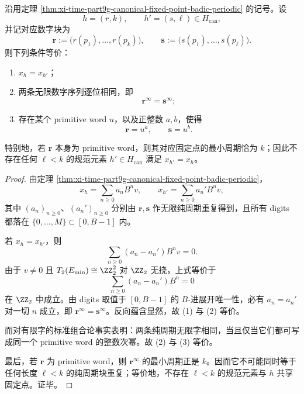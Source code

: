 \begin{corollary}\label{cor:xi-time-part9g-fixed-point-primitive-word-classification}
沿用定理 \ref{thm:xi-time-part9g-canonical-fixed-point-badic-periodic} 的记号。设
\[
h=(r,k),\qquad h'=(s,\ell)\in H_{\mathrm{can}},
\]
并记对应数字块为
\[
\mathbf r:=\bigl(r(p_1),\dots,r(p_k)\bigr),
\qquad
\mathbf s:=\bigl(s(p_1),\dots,s(p_\ell)\bigr).
\]
则下列条件等价：
\begin{enumerate}
  \item \(x_h=x_{h'}\)；
  \item 两条无限数字序列逐位相同，即
  \[
  \mathbf r^\infty=\mathbf s^\infty;
  \]
  \item 存在某个 primitive word \(u\)，以及正整数 \(a,b\)，使得
  \[
  \mathbf r=u^a,\qquad \mathbf s=u^b.
  \]
\end{enumerate}
特别地，若 \(\mathbf r\) 本身为 primitive word，则其对应固定点的最小周期恰为 \(k\)；因此不存在任何 \(\ell<k\) 的规范元素 \(h'\in H_{\mathrm{can}}\) 满足 \(x_{h'}=x_h\)。
\end{corollary}
\begin{proof}
由定理 \ref{thm:xi-time-part9g-canonical-fixed-point-badic-periodic}，
\[
x_h=\sum_{n\ge 0}a_n B^n v,
\qquad
x_{h'}=\sum_{n\ge 0}a_n' B^n v,
\]
其中 \((a_n)_{n\ge 0}\)、\((a_n')_{n\ge 0}\) 分别由 \(\mathbf r,\mathbf s\) 作无限纯周期重复得到，且所有 digits 都落在 \(\{0,\dots,M\}\subset[0,B-1]\) 内。

若 \(x_h=x_{h'}\)，则
\[
\sum_{n\ge 0}(a_n-a_n')B^n v=0.
\]
由于 \(v\neq 0\) 且 \(T_2(E_{\min})\cong \ZZ_2^2\) 对 \(\ZZ_2\) 无挠，上式等价于
\[
\sum_{n\ge 0}(a_n-a_n')B^n=0
\]
在 \(\ZZ_2\) 中成立。由 digits 取值于 \([0,B-1]\) 的 \(B\)-进展开唯一性，必有 \(a_n=a_n'\) 对一切 \(n\) 成立，即 \(\mathbf r^\infty=\mathbf s^\infty\)。反向蕴含显然，故 (1) 与 (2) 等价。

而对有限字的标准组合论事实表明：两条纯周期无限字相同，当且仅当它们都可写成同一个 primitive word 的整数次幂。故 (2) 与 (3) 等价。

最后，若 \(\mathbf r\) 为 primitive word，则 \(\mathbf r^\infty\) 的最小周期正是 \(k\)。因而它不可能同时等于任何长度 \(\ell<k\) 的纯周期块重复；等价地，不存在 \(\ell<k\) 的规范元素与 \(h\) 共享固定点。证毕。
\end{proof}

